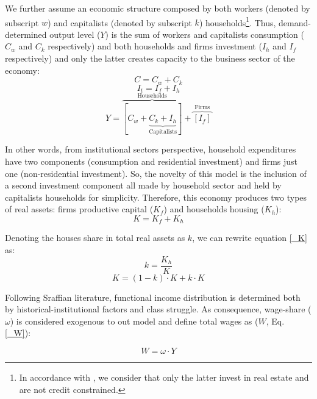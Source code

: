 \documentclass[11pt]{article}
\begin{document}
We further assume an economic structure composed by both workers (denoted by subscript \(w\)) and capitalists (denoted by subscript \(k\)) households\footnote{In accordance with \textcite{albanesi_credit_2017}, we consider that only the latter invest in real estate and are not credit constrained.}.
Thus, demand-determined output level (\(Y\))  is the sum of workers and capitalists consumption (\(C_w\) and \(C_k\) respectively) and both households and firms investment (\(I_h\) and \(I_f\) respectively) and only the latter creates capacity to the business sector of the economy:
\begin{equation}
\label{_Ct}
    C = C_w + C_k
\end{equation}
\begin{equation}
\label{_It}
    I_t = I_f + I_h
\end{equation}
\begin{equation}
\label{_Y}
    Y = \overbrace{[C_w + \underbrace{C_k + I_h}_{\text{Capitalists}}]}^{\text{Households}} + \overbrace{[I_f]}^{\text{Firms}}
\end{equation}

In other words, from institutional sectors perspective, household expenditures have two components (consumption and residential investment) and firms just one (non-residential investment).
So, the novelty of this model is the inclusion of a second investment component all made by household sector and held by capitalists households for simplicity. 
Therefore, this economy produces two types of real assets: firms productive capital (\(K_f\)) and households housing (\(K_h\)):
\begin{equation}
    \label{_K}
    K = K_f + K_h
\end{equation}

Denoting the houses share in total real assets as \(k\), we can rewrite equation \ref{_K} as:
\begin{equation}
\label{_k}
    k = \frac{K_h}{K}
\end{equation}
$$
K = (1-k)\cdot K + k\cdot K
$$

Following Sraffian literature, functional income distribution is determined both by historical-institutional factors and class struggle. 
As consequence, wage-share (\(\omega\)) is considered exogenous to out model and define total wages as (\(W\), Eq. \ref{_W}): 

\begin{equation}
\label{_W}
    W = \omega\cdot Y
\end{equation}
\end{document}
